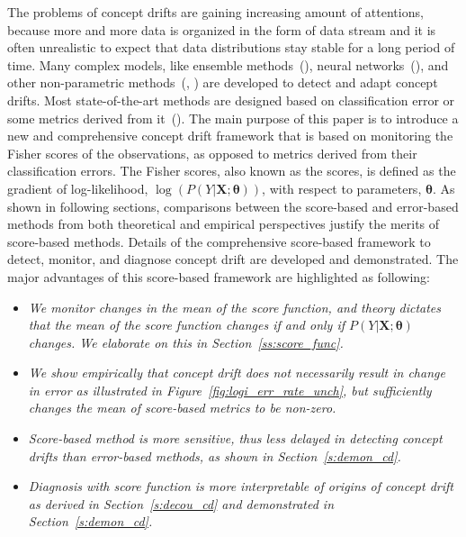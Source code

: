 \documentclass[twoside,11pt]{article}
\begin{document}
The problems of concept drifts are gaining increasing amount of attentions, because more and more data is organized in the form of data stream and it is often unrealistic to expect that data distributions stay stable for a long period of time. Many complex models, like ensemble methods~(\cite{wang2003mining}), neural networks~(\cite{calandra2012learning}), and other non-parametric methods~(\cite{dos2016fast}, \cite{frias2015online}) are developed to detect and adapt concept drifts. Most state-of-the-art methods are designed based on classification error or some metrics derived from it~(\cite{barros2018large,ross2012exponentially,gonccalves2014comparative}). The main purpose of this paper is to introduce a new and comprehensive concept drift framework that is based on monitoring the Fisher scores of the observations, as opposed to metrics derived from their classification errors. The Fisher scores, also known as the scores, is defined as the gradient of log-likelihood, $\log(P(Y|\bm{X};\bm{\theta}))$, with respect to parameters, $\bm{\theta}$. As shown in following sections, comparisons between the score-based and error-based methods from both theoretical and empirical perspectives justify the merits of score-based methods. Details of the comprehensive score-based framework to detect, monitor, and diagnose concept drift are developed and demonstrated. The major advantages of this score-based framework are highlighted as following:

\begin{itemize}
\item
\textit{We monitor changes in the mean of the score function, and theory dictates that the mean of the score function changes if and only if $P(Y|\bm{X};\bm{\theta})$ changes. We elaborate on this in Section~\ref{ss:score_func}.}
\item
\textit{We show empirically that concept drift does not necessarily result in change in error as illustrated in Figure~\ref{fig:logi_err_rate_unch}, but sufficiently changes the mean of score-based metrics to be non-zero.}
\item
\textit{Score-based method is more sensitive, thus less delayed in detecting concept drifts than error-based methods, as shown in Section~\ref{s:demon_cd}.}
\item
\textit{Diagnosis with score function is more interpretable of origins of concept drift as derived in Section~\ref{s:decou_cd} and demonstrated in Section~\ref{s:demon_cd}.}
\end{itemize}
\end{document}
